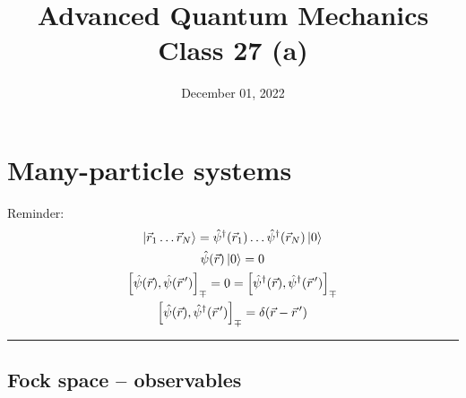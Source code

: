 \documentclass[12pt]{article}
\title{Advanced Quantum Mechanics\\Class 27 (a)}
\date{December 01, 2022}                                           %
\begin{document}
\maketitle

\setcounter{section}{8}


\section{Many-particle systems}
\setcounter{subsection}{2}
Reminder:
\begin{gather*}
\ket{\vec{r}_1\ldots\vec{r}_N} = \hat{\psi}^{\dagger}(\vec{r}_1)\ldots\hat{\psi}^{\dagger}(\vec{r}_N) \ket{0}\label{eq:g50}\\
\hat{\psi}(\vec{r})\ket{0} = 0\label{eq:g51}\\
\left[
\hat{\psi}(\vec{r}),\hat{\psi}(\vec{r}^{\,\prime})
\right]_\mp 
= 0 = 
\left[
\hat{\psi}^{\dagger}(\vec{r}),\hat{\psi}^{\dagger}(\vec{r}^{\,\prime})
\right]_\mp\label{eq:g52}\\
\left[
\hat{\psi}(\vec{r}),\hat{\psi}^{\dagger}(\vec{r}^{\,\prime})
\right]_\mp = \delta(\vec{r} - \vec{r}^{\,\prime})\label{eq:g53}
\end{gather*}
\rule{\textwidth}{1pt}

\subsection{Fock space -- observables}
\end{document}
